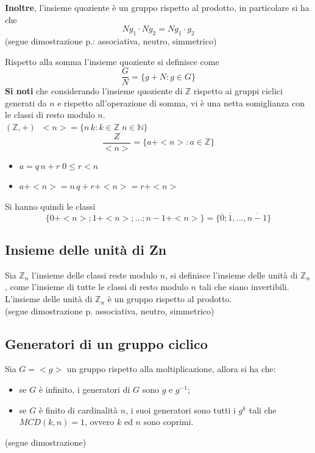 \begin{flushleft}
\textbf{Inoltre}, l'insieme quoziente è un gruppo rispetto al prodotto, in particolare si ha che
\[N g_1\cdot Ng_2 = Ng_1 \cdot g_2\]
(segue dimostrazione p.: associativa, neutro, simmetrico)
\\ \vspace{300px}

Rispetto alla somma l'insieme quoziente si definisce come
\[\frac{G}{N} = \{g+N:g\in G\}\]
\textbf{Si noti} che considerando l'insieme quoziente di $\mathbb{Z}$ rispetto ai gruppi ciclici generati da $n$ e rispetto all'operazione di somma, vi è una netta somiglianza con le classi di resto modulo $n$.\\
$(\mathbb{Z}, +)\;\;<n>=\{n\,k: k\in \mathbb{Z}\;n\in \mathbb{N}\}$
\[\frac{Z}{<n>} = \{a+<n>: a\in \mathbb{Z}\}\]
\begin{itemize}
    \item[] $a=q\,n + r\;0\leq r< n$
    \item[] $a+<n> = n\,q + r + <n> = r+<n>$
\end{itemize}
Si hanno quindi le classi
\[\{0+<n>; 1 + <n>;...;n-1+<n>\} = \{\overline{0};\overline{1},...,\overline{n-1}\}\]



\subsection{Insieme delle unità di Zn}
Sia $\mathbb{Z}_n$ l'insieme delle classi reste modulo $n$, si definisce l'insieme delle unità di $\mathbb{Z}_n$, come l'insieme di tutte le classi di resto modulo $n$ tali che siano invertibili.\\
L'insieme delle unità di $\mathbb{Z}_n$ è un gruppo rispetto al prodotto.\\
(segue dimostrazione p. associativa, neutro, simmetrico)
\\ \vspace{300px}

\subsection{Generatori di un gruppo ciclico}
Sia $G = <g>$ un gruppo rispetto alla moltiplicazione, allora si ha che:
\begin{itemize}
    \item se $G$ è infinito, i generatori di $G$ sono $g$ e $g^{-1}$;
    \item se $G$ è finito di cardinalità $n$, i suoi generatori sono tutti i $g^k$ tali che $MCD(k,n) = 1$, ovvero $k$ ed $n$ sono coprimi.
\end{itemize}
(segue dimostrazione)
\\ \vspace{300px}


\end{flushleft}
